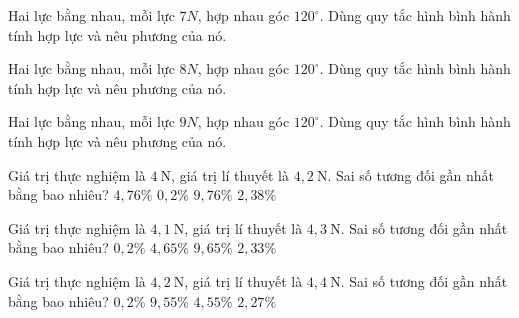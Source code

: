 \begin{bt}
Hai lực bằng nhau, mỗi lực $7N$, hợp nhau góc $120^\circ$. Dùng quy tắc hình bình hành tính hợp lực và nêu phương của nó.
\end{bt}

\begin{bt}
Hai lực bằng nhau, mỗi lực $8N$, hợp nhau góc $120^\circ$. Dùng quy tắc hình bình hành tính hợp lực và nêu phương của nó.
\end{bt}

\begin{bt}
Hai lực bằng nhau, mỗi lực $9N$, hợp nhau góc $120^\circ$. Dùng quy tắc hình bình hành tính hợp lực và nêu phương của nó.
\end{bt}

\begin{ex}
Giá trị thực nghiệm là $4\ \mathrm{N}$, giá trị lí thuyết là $4,2\ \mathrm{N}$. Sai số tương đối gần nhất bằng bao nhiêu?
\choice
{\True $4,76\%$}
{$0,2\%$}
{$9,76\%$}
{$2,38\%$}
\end{ex}

\begin{ex}
Giá trị thực nghiệm là $4,1\ \mathrm{N}$, giá trị lí thuyết là $4,3\ \mathrm{N}$. Sai số tương đối gần nhất bằng bao nhiêu?
\choice
{$0,2\%$}
{\True $4,65\%$}
{$9,65\%$}
{$2,33\%$}
\end{ex}

\begin{ex}
Giá trị thực nghiệm là $4,2\ \mathrm{N}$, giá trị lí thuyết là $4,4\ \mathrm{N}$. Sai số tương đối gần nhất bằng bao nhiêu?
\choice
{$0,2\%$}
{$9,55\%$}
{\True $4,55\%$}
{$2,27\%$}
\end{ex}

